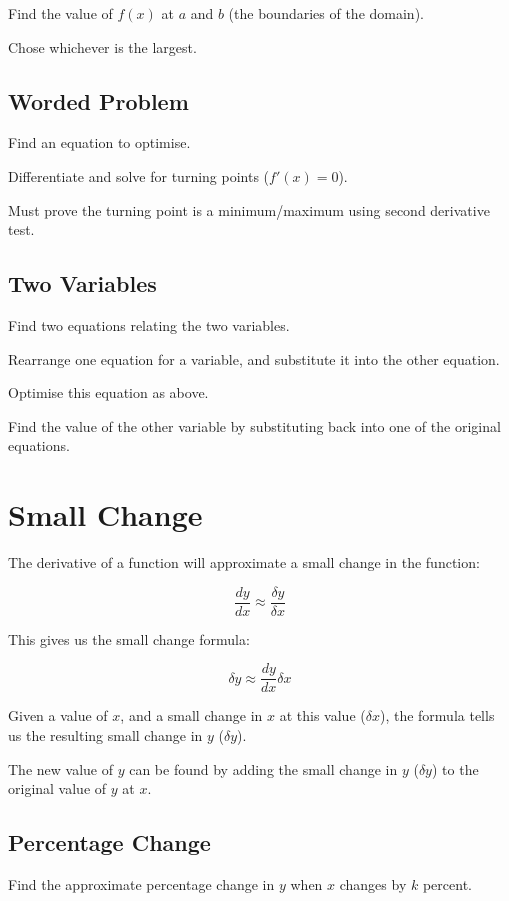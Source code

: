 \documentclass[a4paper,11pt]{article}
\begin{document}
Find the value of $f(x)$ at $a$ and $b$ (the boundaries of the domain).

Chose whichever is the largest.


\subsection{Worded Problem}

Find an equation to optimise.

Differentiate and solve for turning points ($f'(x) = 0$).

Must prove the turning point is a minimum/maximum using second derivative test.


\subsection{Two Variables}

Find two equations relating the two variables.

Rearrange one equation for a variable, and substitute it into the other
equation.

Optimise this equation as above.

Find the value of the other variable by substituting back into one of the
original equations.




\section{Small Change}

The derivative of a function will approximate a small change in the function:

$$
\frac{dy}{dx} \approx \frac{\delta y}{\delta x}
$$

This gives us the small change formula:

$$
\delta y \approx \frac{dy}{dx} \delta x
$$

Given a value of $x$, and a small change in $x$ at this value ($\delta x$), the
formula tells us the resulting small change in $y$ ($\delta y$).

The new value of $y$ can be found by adding the small change in $y$
($\delta y$) to the original value of $y$ at $x$.


\subsection{Percentage Change}

Find the approximate percentage change in $y$ when $x$ changes by $k$ percent.
\end{document}
